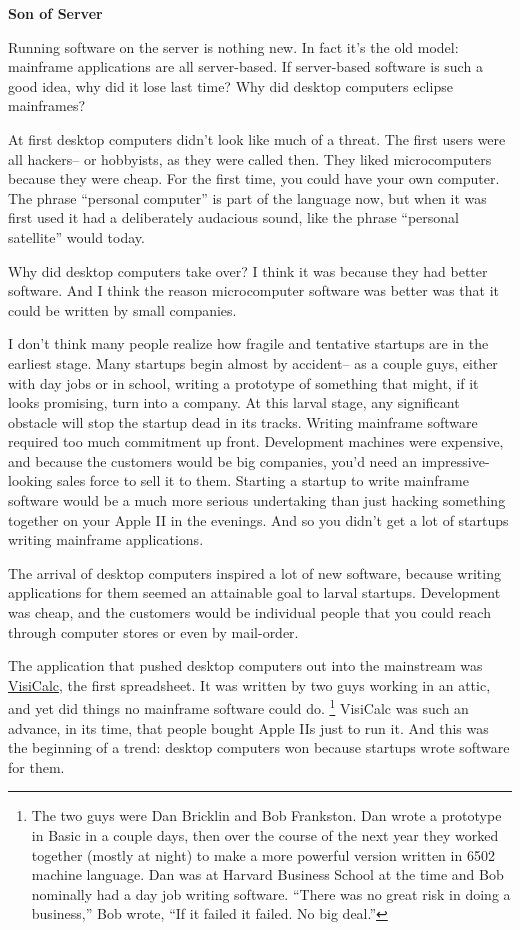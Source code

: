 \documentclass[12pt]{book}
\begin{document}
\textbf{Son of Server}

Running software on the server is nothing new. In fact it's the old
model: mainframe applications are all server-based. If server-based
software is such a good idea, why did it lose last time? Why did desktop
computers eclipse mainframes?

At first desktop computers didn't look like much of a threat. The first
users were all hackers-- or hobbyists, as they were called then. They
liked microcomputers because they were cheap. For the first time, you
could have your own computer. The phrase ``personal computer'' is part
of the language now, but when it was first used it had a deliberately
audacious sound, like the phrase ``personal satellite'' would today.

Why did desktop computers take over? I think it was because they had
better software. And I think the reason microcomputer software was
better was that it could be written by small companies.

I don't think many people realize how fragile and tentative startups are
in the earliest stage. Many startups begin almost by accident-- as a
couple guys, either with day jobs or in school, writing a prototype of
something that might, if it looks promising, turn into a company. At
this larval stage, any significant obstacle will stop the startup dead
in its tracks. Writing mainframe software required too much commitment
up front. Development machines were expensive, and because the customers
would be big companies, you'd need an impressive-looking sales force to
sell it to them. Starting a startup to write mainframe software would be
a much more serious undertaking than just hacking something together on
your Apple II in the evenings. And so you didn't get a lot of startups
writing mainframe applications.

The arrival of desktop computers inspired a lot of new software, because
writing applications for them seemed an attainable goal to larval
startups. Development was cheap, and the customers would be individual
people that you could reach through computer stores or even by
mail-order.

The application that pushed desktop computers out into the mainstream
was \href{http://www.bricklin.com/visicalc.htm}{VisiCalc}, the first
spreadsheet. It was written by two guys working in an attic, and yet did
things no mainframe software could do. \footnote{The two guys were Dan Bricklin and Bob Frankston. Dan wrote a
prototype in Basic in a couple days, then over the course of the next
year they worked together (mostly at night) to make a more powerful
version written in 6502 machine language. Dan was at Harvard Business
School at the time and Bob nominally had a day job writing software.
``There was no great risk in doing a business,'' Bob wrote, ``If it
failed it failed. No big deal.''} VisiCalc was such an
advance, in its time, that people bought Apple IIs just to run it. And
this was the beginning of a trend: desktop computers won because
startups wrote software for them.
\end{document}
